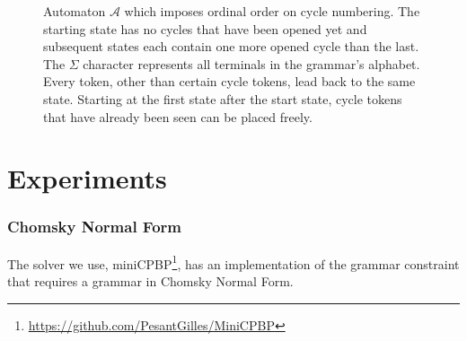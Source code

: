 \documentclass[../Document.tex]{subfiles}
\begin{document}
\begin{figure}
    \centering
    \caption[Automaton $\mathcal{A}$ which imposes ordinal order on cycle numbering.]{Automaton $\mathcal{A}$ which imposes ordinal order on cycle numbering. The starting state has no cycles that have been opened yet and subsequent states each contain one more opened cycle than the last. The $\Sigma$ character represents all terminals in the grammar's alphabet. Every token, other than certain cycle tokens, lead back to the same state. Starting at the first state after the start state, cycle tokens that have already been seen can be placed freely.}
    \label{fig:cycleCountingAutomaton}
\end{figure}


\section{Experiments}

\subsubsection{Chomsky Normal Form}
The solver we use, miniCPBP\footnote{\url{https://github.com/PesantGilles/MiniCPBP}}, has an implementation of the grammar constraint that requires a grammar in Chomsky Normal Form.
\end{document}
